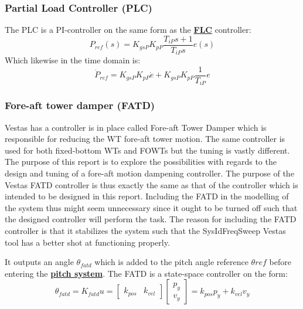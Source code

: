 \subsubsection{Partial Load Controller (PLC)}
The PLC is a PI-controller on the same form as the \hyperref[sec:mod_wtLin_FLC]{\textbf{FLC}} controller:
\begin{equation}\label{eq:wtlin_comp_flc}
	P_{ref}(s) = K_{gs P} K_{p P} \dfrac{T_{i P} s + 1}{T_{i P} s} e(s)
\end{equation}
Which likewise in the time domain is:
\begin{equation}\label{key}
	\dot{P}_{ref} = K_{gs P} K_{p P} \dot{e} +  K_{gs P} K_{p P} \dfrac{1}{T_{i P}}e
\end{equation}



\subsubsection{Fore-aft tower damper (FATD)}
Vestas has a controller is in place called Fore-aft Tower Damper which is responsible for reducing the WT fore-aft tower motion. The same controller is used for both fixed-bottom WTs and FOWTs but the tuning is vastly different. The purpose of this report is to explore the possibilities with regards to the design and tuning of a fore-aft motion dampening controller. The purpose of the Vestas FATD controller is thus exactly the same as that of the controller which is intended to be designed in this report. Including the FATD in the modelling of the system thus might seem unnecessary since it ought to be turned off such that the designed controller will perform the task. The reason for including the FATD controller is that it stabilizes the system such that the SysIdFreqSweep Vestas tool has a better shot at functioning properly.

It outputs an angle $ \theta_{fatd} $ which is added to the pitch angle reference $ \theta{ref} $ before entering the \hyperref[sec:mod_wtLin_pitch]{\textbf{pitch system}}. The FATD is a state-space controller on the form:
\begin{equation}\label{eq:wtLin_fatd}
	\theta_{fatd} = K_{fatd}u = \begin{bmatrix} k_{pos} & k_{vel} \end{bmatrix} \begin{bmatrix} p_y \\ v_y \end{bmatrix} = k_{pos} p_y + k_{vel} v_y
\end{equation}


